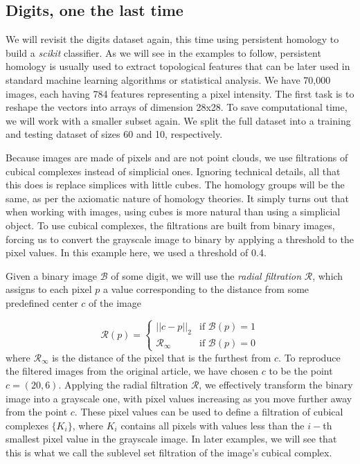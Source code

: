 \subsection{Digits, one the last time}
We will revisit the digits dataset again, this time using persistent homology to build a \textit{scikit} classifier. As we will see in the examples to follow, persistent homology is usually used to extract topological features that can be later used in standard machine learning algorithms or statistical analysis. We have 70,000 images, each having 784 features representing a pixel intensity. The first task is to reshape the vectors into arrays of dimension 28x28. To save computational time, we will work with a smaller subset again. We split the full dataset into a training and testing dataset of sizes 60 and 10, respectively.

Because images are made of pixels and are not point clouds, we use filtrations of cubical complexes instead of simplicial ones. Ignoring technical details, all that this does is replace simplices with little cubes. The homology groups will be the same, as per the axiomatic nature of homology theories. It simply turns out that when working with images, using cubes is more natural than using a simplicial object. To use cubical complexes, the filtrations are built from binary images, forcing us to convert the grayscale image to binary by applying a threshold to the pixel values. In this example here, we used a threshold of 0.4.

Given a binary image $\mathcal{B}$ of some digit, we will use the \textit{radial filtration} $\mathcal{R}$, which assigns to each pixel $p$ a value corresponding to the distance from some predefined center $c$ of the image

\begin{equation*}
  \mathcal{R}(p) =
  \left\{
    \begin{array}{ll}
      ||c-p||_{2} & \mbox{if } \mathcal{B}(p) = 1 \\
      \mathcal{R}_{\infty} & \mbox{if } \mathcal{B}(p) = 0
    \end{array}
  \right.
\end{equation*}
where $\mathcal{R}_{\infty}$ is the distance of the pixel that is the furthest from $c$. To reproduce the filtered images from the original article, we have chosen $c$ to be the point $c = (20, 6)$. Applying the radial filtration $\mathcal{R}$, we effectively transform the binary image into a grayscale one, with pixel values increasing as you move further away from the point $c$. These pixel values can be used to define a filtration of cubical complexes $\{K_{i}\}$, where $K_{i}$ contains all pixels with values less than the $i-$th smallest pixel value in the grayscale image. In later examples, we will see that this is what we call the sublevel set filtration of the image's cubical complex.

